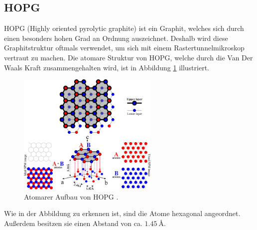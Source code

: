 \subsection{HOPG}
HOPG (Highly oriented pyrolytic graphite) ist ein Graphit, welches sich durch einen besonders hohen Grad
an Ordnung auszeichnet. Deshalb wird diese Graphitstruktur oftmals verwendet, um sich mit einem Rastertunnelmikroskop vertraut zu machen. %
Die atomare Struktur von HOPG, welche durch die Van Der Waals Kraft zusammengehalten wird, %
ist in Abbildung \ref{fig: hopg} illustriert.
\begin{figure}[!h]
  \centering
  \includegraphics[width=0.6\textwidth]{./pics/hopg.jpg}
  \caption{Atomarer Aufbau von HOPG \cite{hopg}.}
  \label{fig: hopg}
\end{figure}
Wie in der Abbildung zu erkennen ist, sind die Atome hexagonal angeordnet. Außerdem besitzen sie einen Abstand von ca.
$\SI{1.45}{\angstrom}$. %
